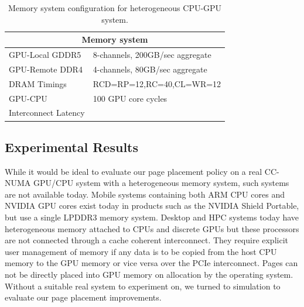 \begin{table}[t]
\begin{center}
\begin{small}
\begin{tabular}{|l|l|}
\hline
\multicolumn{2}{|c|}{Memory system}\\
\hline
GPU-Local GDDR5 & 8-channels, 200GB/sec aggregate\\
\hline
GPU-Remote DDR4& 4-channels, 80GB/sec aggregate\\
\hline
DRAM Timings & \multicolumn{1}{|l|}{RCD=RP=12,RC=40,CL=WR=12}\\
\hline
GPU-CPU &  100 GPU core cycles\\
Interconnect Latency & \\
\hline
\end{tabular}
\caption{Memory system configuration for heterogeneous CPU-GPU system.}
\label{tab:bw-methodology}
\end{small}
\end{center}
\vspace{-0.15in}
\end{table}

\subsection{Experimental Results}

While it would be ideal to evaluate our page placement policy on a real CC-NUMA
GPU/CPU system with a heterogeneous memory system, such systems are not available today.
Mobile systems containing both ARM CPU cores and NVIDIA GPU cores exist today in products
such as the NVIDIA Shield Portable, but use a single LPDDR3 memory system.
Desktop and HPC systems today have heterogeneous memory attached to CPUs and discrete
GPUs but these processors are not connected through a cache coherent interconnect.  They require explicit user 
management of memory if any data is to be copied from the host CPU memory to the GPU memory or vice versa
over the PCIe interconnect. Pages can not be directly placed into GPU memory on allocation by the operating system.
Without a suitable real system to experiment on, we turned to simulation to evaluate our
page placement improvements.

